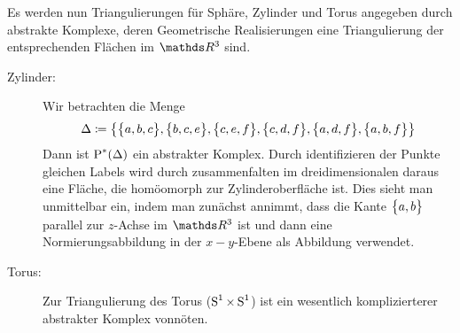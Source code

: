 \begin{Bsp}[Triangulierung]
  Es werden nun Triangulierungen für Sphäre, Zylinder und Torus
  angegeben durch abstrakte Komplexe, deren Geometrische Realisierungen
  eine Triangulierung der entsprechenden Flächen im $\R^3$ sind.

  \begin{description}
  \item[Zylinder:] Wir betrachten die Menge
    \begin{gather*}
      \Delta \coloneqq
      \sset{\sset{a,b,c},\sset{b,c,e},\sset{c,e,f},\sset{c,d,f}%
        ,\sset{a,d,f},\sset{a,b,f}}
    \end{gather*}
    Dann ist $\operatorname{P}^*(\Delta)$ ein abstrakter Komplex.  Durch
    identifizieren der Punkte gleichen Labels wird durch
    zusammenfalten im dreidimensionalen daraus eine Fläche, die
    homöomorph zur Zylinderoberfläche ist. Dies sieht man unmittelbar
    ein, indem man zunächst annimmt, dass die Kante $\bigl\{ a,b \bigr\}$
    parallel zur $z$-Achse im $\R^3$ ist und dann eine
    Normierungsabbildung in der $x-y$-Ebene als Abbildung verwendet.
    \newline
  \begin{center}
      \parbox{0.7\linewidth}{%
      \hfill
      }
    \end{center}
  \item[Torus:] Zur Triangulierung des Torus ($\operatorname{S}^1 \times \operatorname{S}^1$)
    ist ein wesentlich komplizierterer abstrakter Komplex
    vonnöten.


\end{description}
\end{Bsp}
